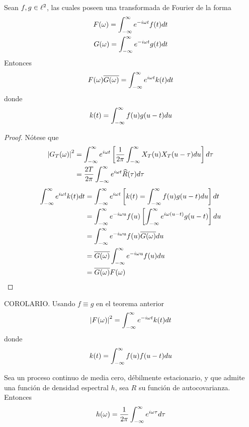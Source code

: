 \begin{teorema}
Sean $f, g \in \ell^{2}$, las cuales poseen una transformada de Fourier de la forma
\begin{align*}
F(\omega) = \int_{-\infty}^{\infty} e^{-i \omega t} f(t) dt \\
G(\omega) = \int_{-\infty}^{\infty} e^{-i \omega t} g(t) dt 
\end{align*}
Entonces
\begin{equation}
F(\omega) \overline{G(\omega)} = \int_{-\infty}^{\infty} e^{i \omega t} k(t) dt
\end{equation}
donde
\begin{equation}
k(t) = \int_{-\infty}^{\infty} f(u) g(u-t) du
\end{equation}
\end{teorema}

\begin{proof}
Nótese que
\begin{align*}
\left| G_T(\omega) \right|^{2} &= 
\int_{-\infty}^{\infty} e^{i \omega t} \left[ \frac{1}{2\pi} \int_{-\infty}^{\infty} X_T(u) X_T(u-\tau) du \right] d\tau \\
&= 
\frac{2 T}{2\pi } \int_{-\infty}^{\infty} e^{i \omega t} \widehat{R}(\tau) d\tau \\
\end{align*}
\begin{align*}
\int_{-\infty}^{\infty} e^{i \omega t} k(t) dt &= \int_{-\infty}^{\infty} e^{i \omega t} \left[ k(t) = \int_{-\infty}^{\infty} f(u) g(u-t) du \right] dt \\
&= \int_{-\infty}^{\infty} e^{-i \omega u} f(u) \left[ \int_{-\infty}^{\infty} e^{i \omega (u-t)} g(u-t) \right] du \\
&= \int_{-\infty}^{\infty} e^{-i \omega u} f(u) \overline{G(\omega)} du \\
&= \overline{G(\omega)} \int_{-\infty}^{\infty} e^{-i \omega u} f(u)  du \\
&= \overline{G(\omega)} F(\omega) \\
\end{align*}
\end{proof}

\begin{teorema}
COROLARIO. Usando $f \equiv g$ en el teorema anterior
\begin{equation}
\left| F(\omega) \right|^{2} = \int_{-\infty}^{\infty} e^{- i \omega t} k(t) dt 
\end{equation}
donde 
\begin{equation}
k(t) = \int_{-\infty}^{\infty} f(u) f(u-t) du
\end{equation}
\end{teorema}

\begin{teorema}
Sea \xt un proceso continuo de media cero, débilmente estacionario, y que admite una función de densidad espectral $h$, sea $R$ su función de autocovarianza. Entonces
\begin{equation}
h(\omega) = \frac{1}{2\pi} \int_{-\infty}^{\infty} e^{i \omega \tau} d\tau
\end{equation}
\end{teorema}


